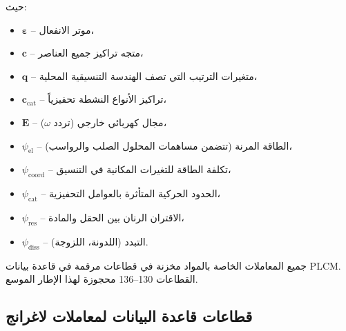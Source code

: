 \documentclass[11pt,a4paper]{article}
\begin{document}
\begin{otherlanguage}{arabic}
		حيث:
		\begin{itemize}
			\item \(\boldsymbol{\varepsilon}\) – موتر الانفعال،
			\item \(\mathbf{c}\) – متجه تراكيز جميع العناصر،
			\item \(\mathbf{q}\) – متغيرات الترتيب التي تصف الهندسة التنسيقية المحلية،
			\item \(\mathbf{c}_{\mathrm{cat}}\) – تراكيز الأنواع النشطة تحفيزياً،
			\item \(\mathbf{E}\) – مجال كهربائي خارجي (تردد \(\omega\))،
			\item \(\psi_{\mathrm{el}}\) – الطاقة المرنة (تتضمن مساهمات المحلول الصلب والرواسب)،
			\item \(\psi_{\mathrm{coord}}\) – تكلفة الطاقة للتغيرات المكانية في التنسيق،
			\item \(\psi_{\mathrm{cat}}\) – الحدود الحركية المتأثرة بالعوامل التحفيزية،
			\item \(\psi_{\mathrm{res}}\) – الاقتران الرنان بين الحقل والمادة،
			\item \(\psi_{\mathrm{diss}}\) – التبدد (اللدونة، اللزوجة).
		\end{itemize}
		
		جميع المعاملات الخاصة بالمواد مخزنة في قطاعات مرقمة في قاعدة بيانات PLCM. القطاعات 130–136 محجوزة لهذا الإطار الموسع.
		
		\subsection{قطاعات قاعدة البيانات لمعاملات لاغرانج}
		\label{subsec:sectors}
		

\end{otherlanguage}
\end{document}
